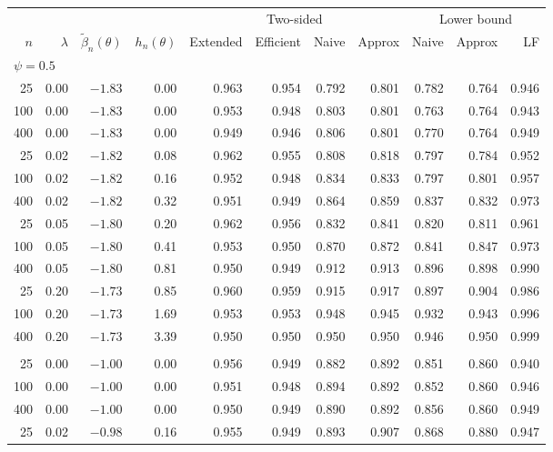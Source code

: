 \begin{tabular}{rrrrrrrrrrr}
\toprule
 & & & & \multicolumn{4}{c}{Two-sided} & \multicolumn{3}{c}{Lower bound} \\
\cmidrule(lr){5-8} \cmidrule(lr){9-11}
$n$ & $\lambda$ & $\tilde\beta_n(\theta)$ & $h_n(\theta)$ & Extended & Efficient & Naive & Approx & Naive & Approx & LF \\
\midrule
\multicolumn{11}{l}{$\psi = 0.5$} \\
25 & 0.00 & $-1.83$ & 0.00 & 0.963 & 0.954 & 0.792 & 0.801 & 0.782 & 0.764 & 0.946 \\
100 & 0.00 & $-1.83$ & 0.00 & 0.953 & 0.948 & 0.803 & 0.801 & 0.763 & 0.764 & 0.943 \\
400 & 0.00 & $-1.83$ & 0.00 & 0.949 & 0.946 & 0.806 & 0.801 & 0.770 & 0.764 & 0.949 \\
25 & 0.02 & $-1.82$ & 0.08 & 0.962 & 0.955 & 0.808 & 0.818 & 0.797 & 0.784 & 0.952 \\
100 & 0.02 & $-1.82$ & 0.16 & 0.952 & 0.948 & 0.834 & 0.833 & 0.797 & 0.801 & 0.957 \\
400 & 0.02 & $-1.82$ & 0.32 & 0.951 & 0.949 & 0.864 & 0.859 & 0.837 & 0.832 & 0.973 \\
25 & 0.05 & $-1.80$ & 0.20 & 0.962 & 0.956 & 0.832 & 0.841 & 0.820 & 0.811 & 0.961 \\
100 & 0.05 & $-1.80$ & 0.41 & 0.953 & 0.950 & 0.870 & 0.872 & 0.841 & 0.847 & 0.973 \\
400 & 0.05 & $-1.80$ & 0.81 & 0.950 & 0.949 & 0.912 & 0.913 & 0.896 & 0.898 & 0.990 \\
25 & 0.20 & $-1.73$ & 0.85 & 0.960 & 0.959 & 0.915 & 0.917 & 0.897 & 0.904 & 0.986 \\
100 & 0.20 & $-1.73$ & 1.69 & 0.953 & 0.953 & 0.948 & 0.945 & 0.932 & 0.943 & 0.996 \\
400 & 0.20 & $-1.73$ & 3.39 & 0.950 & 0.950 & 0.950 & 0.950 & 0.946 & 0.950 & 0.999 \\
\addlinespace
\multicolumn{11}{l}{$\psi = 1.25$} \\
25 & 0.00 & $-1.00$ & 0.00 & 0.956 & 0.949 & 0.882 & 0.892 & 0.851 & 0.860 & 0.940 \\
100 & 0.00 & $-1.00$ & 0.00 & 0.951 & 0.948 & 0.894 & 0.892 & 0.852 & 0.860 & 0.946 \\
400 & 0.00 & $-1.00$ & 0.00 & 0.950 & 0.949 & 0.890 & 0.892 & 0.856 & 0.860 & 0.949 \\
25 & 0.02 & $-0.98$ & 0.16 & 0.955 & 0.949 & 0.893 & 0.907 & 0.868 & 0.880 & 0.947 \\

\end{tabular}
